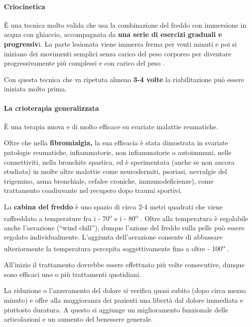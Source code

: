 \paragraph{Criocinetica}
  
  È una tecnica molto valida che usa la combinazione del freddo con
  immersione in acqua con ghiaccio, accompagnata da \textbf{una serie di
  esercizi graduali e progressiv}i. La parte lesionata viene immersa
  ferma per venti minuti e poi si iniziano dei movimenti semplici senza
  carico del peso corporeo per diventare progressivamente più complessi
  e con carico del peso .
  
  Con questa tecnica che va ripetuta almeno \textbf{3-4 volte} la
  riabilitazione può essere iniziata molto prima.
\paragraph{La crioterapia generalizzata}

  È una terapia nuova e di molto efficace su svariate malattie
  reumatiche.

  Oltre che nella \textbf{fibromialgia,} la sua efficacia è stata
  dimostrata in svariate patologie reumatiche, infiammatorie, non
  infiammatorie o autoimmuni, nelle connettiviti, nella bronchite
  spastica, ed è sperimentata (anche se non ancora studiata) in molte
  altre malattie come neurodermiti, psoriasi, nevralgie del trigemino,
  asma bronchiale, cefalee croniche, immunodeficienze), come trattamento
  coadiuvante nel recupero dopo traumi sportivi.

  La \textbf{cabina del freddo} è uno spazio di circa 2-4 metri quadrati
  che viene raffreddato a temperature fra i - 70\textsuperscript{o}  e i - 80\textsuperscript{o} . Oltre alla
  temperatura è regolabile anche l'aerazione (``wind chill''), dunque
  l'azione del freddo sulla pelle può essere regolato individualmente.
  L'aggiunta dell'aerazione consente di abbassare ulteriormente la
  temperatura percepita soggettivamente fino a oltre - 100\textsuperscript{o} .

  All'inizio il trattamento dovrebbe essere effettuato più volte
  consecutive, dunque sono efficaci uno o più trattamenti quotidiani.

  La riduzione o l'azzeramento del dolore si verifica quasi subito (dopo
  circa mezzo minuto) e offre alla maggioranza dei pazienti una libertà
  dal dolore immediata e piuttosto duratura. A questo si aggiunge un
  miglioramento funzionale delle articolazioni e un aumento del
  benessere generale.

